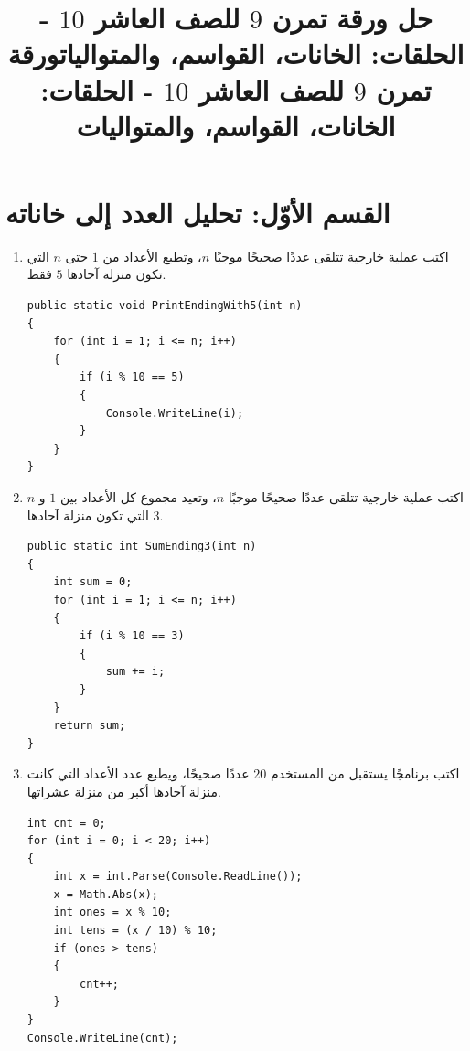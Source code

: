 \documentclass[14pt]{extarticle}
\title{حل ورقة تمرن $9$ للصف العاشر $10$ - الحلقات: الخانات، القواسم، والمتواليات}
\title{ورقة تمرن $9$ للصف العاشر $10$ - الحلقات: الخانات، القواسم، والمتواليات}
\begin{document}
\maketitle
\thispagestyle{fancy}

\section*{القسم الأوّل: تحليل العدد إلى خاناته}

\begin{enumerate}[itemsep=2em]

\item اكتب عملية خارجية تتلقى عددًا صحيحًا موجبًا $n$، وتطبع الأعداد من $1$ حتى $n$ التي تكون منزلة آحادها $5$ فقط.
\ifwithsols
\begin{boxSolution}
\begin{english}
\begin{verbatim}
public static void PrintEndingWith5(int n)
{
    for (int i = 1; i <= n; i++)
    {
        if (i % 10 == 5)
        {
            Console.WriteLine(i);
        }
    }
}
\end{verbatim}
\end{english}
\end{boxSolution}
\fi
\filbreak

\item اكتب عملية خارجية تتلقى عددًا صحيحًا موجبًا $n$، وتعيد مجموع كل الأعداد بين $1$ و $n$ التي تكون منزلة آحادها $3$.
\ifwithsols
\begin{boxSolution}
\begin{english}
\begin{verbatim}
public static int SumEnding3(int n)
{
    int sum = 0;
    for (int i = 1; i <= n; i++)
    {
        if (i % 10 == 3)
        {
            sum += i;
        }
    }
    return sum;
}
\end{verbatim}
\end{english}
\end{boxSolution}
\fi
\filbreak

\item اكتب برنامجًا يستقبل من المستخدم $20$ عددًا صحيحًا، ويطبع عدد الأعداد التي كانت منزلة آحادها أكبر من منزلة عشراتها.
\ifwithsols
\begin{boxSolution}
\begin{english}
\begin{verbatim}
int cnt = 0;
for (int i = 0; i < 20; i++)
{
    int x = int.Parse(Console.ReadLine());
    x = Math.Abs(x);
    int ones = x % 10;
    int tens = (x / 10) % 10;
    if (ones > tens)
    {
        cnt++;
    }
}
Console.WriteLine(cnt);
\end{verbatim}
\end{english}
\end{boxSolution}
\fi
\filbreak


\end{enumerate}
\end{document}

